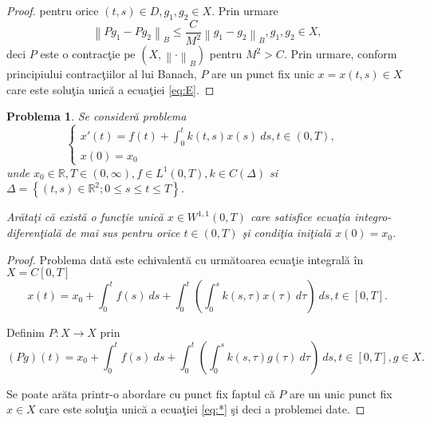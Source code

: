 \documentclass[a4paper,12pt,oneside]{report}
\newtheorem{problem}{Problema}
\begin{document}
\begin{proof}
\noindent pentru orice \(\left ( t,s \right )\in D, g_{1}, g_{2} \in X\). Prin urmare
\begin{displaymath}
  \left \| Pg_{1} - Pg_{2} \right \|_{B} \leq \frac{C}{M^{2}}\left \| g_{1} - g_{2} \right \|_{B}, g_{1}, g_{2}\in X,
\end{displaymath}
deci \(P\) este o contrac\c{t}ie pe \(\left ( X, \left \| \cdot  \right \|_{B} \right )\) pentru \(M^{2} > C\). Prin urmare, conform principiului contrac\c{t}iilor al lui Banach, \(P\) are un punct fix unic \(x = x\left ( t,s \right )\in X\) care este solu\c{t}ia unic\u{a} a ecua\c{t}iei \ref{eq:E}.
\end{proof}
  	      			      			      			      	
\begin{problem}
Se consider\u{a} problema
\begin{displaymath}
  \left\{\begin{matrix}
  {x}'\left ( t \right ) = f\left ( t \right ) + \int_{0}^{t}k\left ( t,s \right )x\left ( s \right ) \ ds , t\in \left ( 0,T \right ),
  & \\ x\left ( 0 \right ) = x_{0}
  \end{matrix}\right.
\end{displaymath}
unde \(x_{0} \in \mathbb{R} , T \in \left ( 0,\infty  \right ), f\in L^{1}\left ( 0,T \right ) , k\in C\left ( \Delta  \right )\) si \(\Delta = \left \{ \left ( t,s \right ) \in \mathbb{R}^{2}; 0\leq s\leq t\leq T \right \}\).

\noindent Ar\u{a}ta\c{t}i c\u{a} exist\u{a} o func\c{t}ie unic\u{a} \(x \in W^{1,1}\left ( 0,T \right )\) care satisfice ecua\c{t}ia integro-diferen\c{t}ial\u{a} de mai sus pentru orice \(t \in \left ( 0,T \right )\) \c{s}i condi\c{t}ia ini\c{t}ial\u{a} \(x\left ( 0 \right ) = x_{0}\).
\end{problem}
  	      			      			      	
\begin{proof}
Problema dat\u{a} este echivalent\u{a} cu urm\u{a}toarea ecua\c{t}ie integral\u{a} \^{i}n \(X = C\left [ 0, T \right ]\)
\begin{displaymath}
  x\left ( t \right ) = x_{0} + \int_{0}^{t}f\left ( s \right )\ ds + \int_{0}^{t}\left ( \int_{0}^{s} k\left ( s,\tau  \right )x\left ( \tau  \right ) \ d\tau \right )\ ds, t \in \left [ 0, T \right ].\label{eq:*} \tag{*}
\end{displaymath}
  	      			      			      	
\noindent Definim \(P : X \rightarrow X\) prin
\begin{displaymath}
  \left ( Pg \right )\left ( t \right ) = x_{0} + \int_{0}^{t}f\left ( s \right ) \ ds + \int_{0}^{t}\left ( \int_{0}^{s}k\left ( s,\tau  \right )g\left ( \tau  \right ) \ d\tau  \right ) \ ds, t \in \left [ 0, T \right ], g \in X.
\end{displaymath}
  	      			      			      	
\noindent Se poate ar\u{a}ta printr-o abordare cu punct fix faptul c\u{a} \(P\) are un unic punct  fix  \(x \in X\) care este solu\c{t}ia unic\u{a} a ecua\c{t}iei \ref{eq:*} \c{s}i deci a problemei date.
\end{proof}
  	      			      			      		
\end{document}
